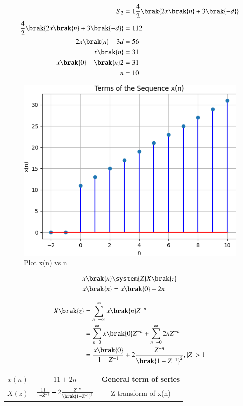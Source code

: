 \documentclass[journal,12pt,twocolumn]{IEEEtran}
\theoremstyle{remark}
\begin{document}
\begin{align}
S_2&=1\frac{4}{2}\brak{2x\brak{n}+3\brak{-d}}\\
\frac{4}{2}\brak{2x\brak{n}+3\brak{-d}}&=112\\
2x\brak{n}-3d&=56\\
x\brak{n}&=31\\
x\brak{0}+\brak{n}2&=31\\
n&=10
\end{align}
\newpage
\begin{figure}
    \includegraphics[width=\columnwidth]{fig.png}
    \centering
    Plot x(n) vs n
    \label{fig:enter-label}
\end{figure}

\begin{align}
	x \brak{n} &\system{Z} X \brak{z}\\
	x\brak{n}&=x\brak{0}+2n
\end{align}

\begin{align}
X\brak{z}&= \sum_{n=-\infty}^{\infty} x\brak{n}Z^{-n} \\
&=\sum_{n=0}^{\infty} x\brak{0}Z^{-n} + \sum_{n=-0}^{\infty}2nZ^{-n}\\
&=\frac{x\brak{0}}{1-Z^{-1}}+2\frac{Z^{-n}}{\brak{1-Z^{-1}}^{2}}, |Z|>1
\end{align}

\footnotesize
\begin{tabular}{|c|c|c|}
\hline
$x(n)$ &$ 11+2n $& General term of series\\
\hline
$X(z)$ & $\frac{11}{1-Z^{-1}}+2\frac{Z^{-n}}{\brak{1-Z^{-1}}^{2}}$ & Z-transform of x(n)\\
\hline
\end{tabular}
\end{document}
